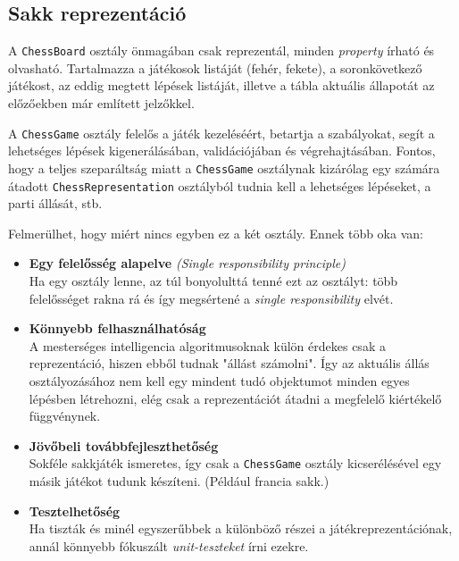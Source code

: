 \documentclass[twoside, a4paper, 12pt]{book}
\begin{document}
\subsection{Sakk reprezentáció}

A \texttt{ChessBoard} osztály önmagában csak reprezentál, minden \textit{property} írható és olvasható. Tartalmazza a játékosok listáját (fehér, fekete), a soronkövetkező játékost, az eddig megtett lépések listáját, illetve a tábla aktuális állapotát az előzőekben már említett jelzőkkel.

A \texttt{ChessGame} osztály felelős a játék kezeléséért, betartja a szabályokat, segít a lehetséges lépések kigenerálásában, validációjában és végrehajtásában. Fontos, hogy a teljes szeparáltság miatt a \texttt{ChessGame} osztálynak kizárólag egy számára átadott \texttt{ChessRepresentation} osztályból tudnia kell a lehetséges lépéseket, a parti állását, stb.

Felmerülhet, hogy miért nincs egyben ez a két osztály. Ennek több oka van:

\begin{itemize}
	\item \textbf{Egy felelősség alapelve} \textit{(Single responsibility principle)}\cite{SingleResponsibilityHu}~\cite{SingleResponsibilityEn}~\cite{SOLID}~ \\
	Ha egy osztály lenne, az túl bonyolulttá tenné ezt az osztályt: több felelősséget rakna rá és így megsértené a \textit{single responsibility} elvét.
	
	\item \textbf{Könnyebb felhasználhatóság} \\
	A mesterséges intelligencia algoritmusoknak külön érdekes csak a reprezentáció, hiszen ebből tudnak "állást számolni". Így az aktuális állás osztályozásához nem kell egy mindent tudó objektumot minden egyes lépésben létrehozni, elég csak a reprezentációt átadni a megfelelő kiértékelő függvénynek.
	
	\item \textbf{Jövőbeli továbbfejleszthetőség} \\
	Sokféle sakkjáték ismeretes, így csak a \texttt{ChessGame} osztály kicserélésével egy másik játékot tudunk készíteni. (Például francia sakk.)
	
	\item \textbf{Tesztelhetőség} \\
	Ha tiszták és minél egyszerűbbek a különböző részei a játékreprezentációnak, annál könnyebb fókuszált \textit{unit-teszteket} írni ezekre.
\end{itemize}
\end{document}
